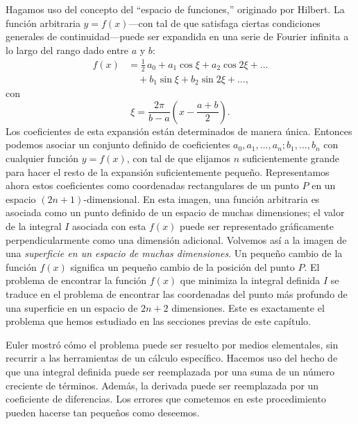 \documentclass[12pt,a4paper]{book}
\begin{document}
Hagamos uso del concepto del ``espacio de funciones,'' originado por Hilbert. La función arbitraria $y = f(x)$---con tal de que satisfaga ciertas condiciones generales de continuidad---puede ser expandida en una serie de Fourier infinita a lo largo del rango dado entre $a$ y $b$:
\begin{equation}
\begin{aligned}
f(x) &= \tfrac{1}{2}\,a_0 + a_1 \cos \xi + a_2 \cos 2\xi + \ldots \\
&\quad + b_1 \sin \xi + b_2 \sin 2\xi + \ldots, \tag{27.8}
\end{aligned}
\end{equation}
con
\[
\xi = \frac{2\pi}{b - a} \left( x - \frac{a + b}{2} \right).
\]
Los coeficientes de esta expansión están determinados de manera única. Entonces podemos asociar un conjunto definido de coeficientes $a_0, a_1, \ldots, a_n; b_1, \ldots, b_n$ con cualquier función $y = f(x)$, con tal de que elijamos $n$ suficientemente grande para hacer el resto de la expansión suficientemente pequeño. Representamos ahora estos coeficientes como coordenadas rectangulares de un punto $P$ en un espacio $(2n + 1)$-dimensional. En esta imagen, una función arbitraria es asociada como un punto definido de un espacio de muchas dimensiones; el valor de la integral $I$ asociada con esta $f(x)$ puede ser representado gráficamente perpendicularmente como una dimensión adicional. Volvemos así a la imagen de una \textit{superficie en un espacio de muchas dimensiones}. Un pequeño cambio de la función $f(x)$ significa un pequeño cambio de la posición del punto $P$. El problema de encontrar la función $f(x)$ que minimiza la integral definida $I$ se traduce en el problema de encontrar las coordenadas del punto más profundo de una superficie en un espacio de $2n + 2$ dimensiones. Este es exactamente el problema que hemos estudiado en las secciones previas de este capítulo.

Euler mostró cómo el problema puede ser resuelto por medios elementales, sin recurrir a las herramientas de un cálculo específico. Hacemos uso del hecho de que una integral definida puede ser reemplazada por una suma de un número creciente de términos. Además, la derivada puede ser reemplazada por un coeficiente de diferencias. Los errores que cometemos en este procedimiento pueden hacerse tan pequeños como deseemos.
\end{document}
